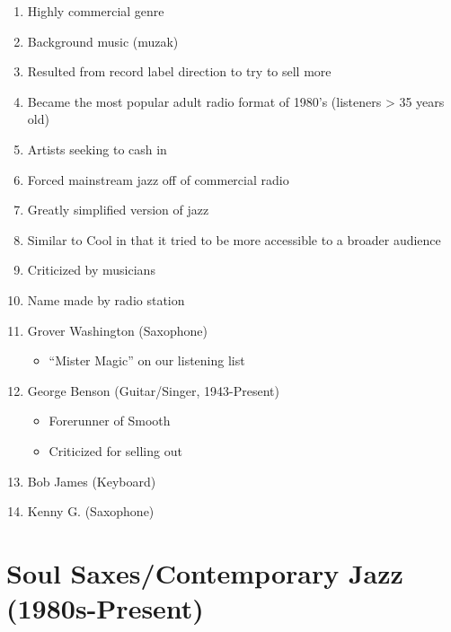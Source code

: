 \documentclass[]{article}
\providecommand{\tightlist}{%
  \setlength{\itemsep}{0pt}\setlength{\parskip}{0pt}}
\begin{document}
\begin{enumerate}
\def\labelenumi{\arabic{enumi}.}
\tightlist
\item
  Highly commercial genre
\item
  Background music (muzak)
\item
  Resulted from record label direction to try to sell more
\item
  Became the most popular adult radio format of 1980's (listeners
  \textgreater{} 35 years old)
\item
  Artists seeking to cash in
\item
  Forced mainstream jazz off of commercial radio
\item
  Greatly simplified version of jazz
\item
  Similar to Cool in that it tried to be more accessible to a broader
  audience
\item
  Criticized by musicians
\item
  Name made by radio station
\item
  Grover Washington (Saxophone)

  \begin{itemize}
  \tightlist
  \item
    ``Mister Magic'' on our listening list
  \end{itemize}
\item
  George Benson (Guitar/Singer, 1943-Present)

  \begin{itemize}
  \tightlist
  \item
    Forerunner of Smooth
  \item
    Criticized for selling out
  \end{itemize}
\item
  Bob James (Keyboard)
\item
  Kenny G. (Saxophone)
\end{enumerate}

\section{Soul Saxes/Contemporary Jazz
(1980s-Present)}\label{soul-saxescontemporary-jazz-1980s-present}
\end{document}
